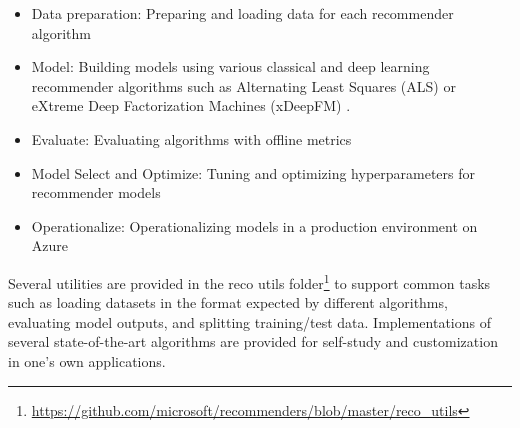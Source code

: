 \begin{itemize}
\item Data preparation: Preparing and loading data for each recommender algorithm
\item Model: Building models using various classical and deep learning recommender algorithms such as Alternating Least Squares (ALS) \cite{koren2009matrix} or eXtreme Deep Factorization Machines (xDeepFM) \cite{lian2018xdeepfm}.
\item Evaluate: Evaluating algorithms with offline metrics
\item Model Select and Optimize: Tuning and optimizing hyperparameters for recommender models
\item Operationalize: Operationalizing models in a production environment on Azure
\end{itemize}

Several utilities are provided in the 
reco utils folder\footnote{\url{https://github.com/microsoft/recommenders/blob/master/reco_utils}} 
to support common tasks such as loading datasets in the format expected by 
different algorithms, evaluating model outputs, and splitting training/test data. 
Implementations of several state-of-the-art algorithms are provided for self-study and 
customization in one's own applications.

